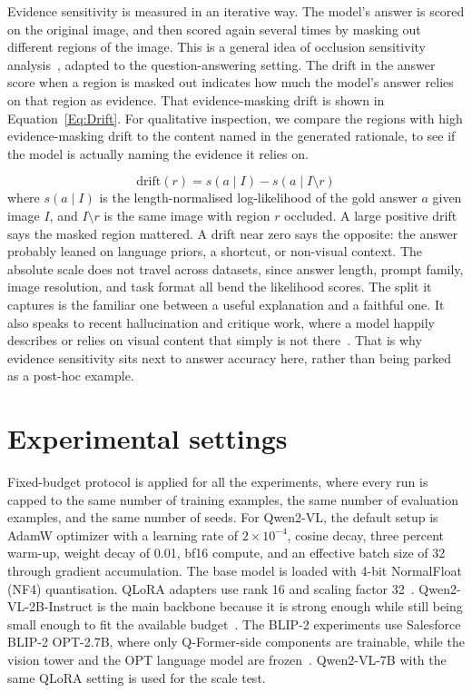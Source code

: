 \documentclass[12pt,bibliography=totoc,listof=totoc,BCOR=5mm,DIV=12,oneside,open=any]{scrbook}
\let\cite\citep
\begin{document}
Evidence sensitivity is measured in an iterative way.
The model's answer is scored on the original image, and then scored again several times by masking out different regions of the image.
This is a general idea of occlusion sensitivity analysis~\cite{zeiler2014visualizing}, adapted to the question-answering setting.
The drift in the answer score when a region is masked out indicates how much the model's answer relies on that region as evidence.
That evidence-masking drift is shown in Equation~\ref{Eq:Drift}.
For qualitative inspection, we compare the regions with high evidence-masking drift to the content named in the generated rationale,
to see if the model is actually naming the evidence it relies on.

\begin{equation}
    \mathrm{drift}(r) = s\!\left(a \mid I\right) - s\!\left(a \mid I \setminus r\right)
    \label{Eq:Drift}
\end{equation}
where $s(a \mid I)$ is the length-normalised log-likelihood of the gold answer $a$ given image $I$, and $I \setminus r$ is the same image with region $r$ occluded.
A large positive drift says the masked region mattered.
A drift near zero says the opposite: the answer probably leaned on language priors, a shortcut, or non-visual context.
The absolute scale does not travel across datasets, since answer length, prompt family, image resolution, and task format all bend the likelihood scores.
The split it captures is the familiar one between a useful explanation and a faithful one.
It also speaks to recent hallucination and critique work, where a model happily describes or relies on visual content that simply is not there~\cite{guan2024hallusionbench,jiang2024hacl,wu2025visco,zhang2025criticv}.
That is why evidence sensitivity sits next to answer accuracy here, rather than being parked as a post-hoc example.

\section{Experimental settings}

Fixed-budget protocol is applied for all the experiments, 
where every run is capped to the same number of training examples,
the same number of evaluation examples, and the same number of seeds.
For Qwen2-VL, the default setup is AdamW optimizer with a learning rate of $2 \times 10^{-4}$,
cosine decay, three percent warm-up, weight decay of 0.01, bf16 compute, and an effective batch size of 32 through gradient accumulation.
The base model is loaded with 4-bit NormalFloat (NF4) quantisation.
QLoRA adapters use rank 16 and scaling factor 32~\cite{hu2022lora,dettmers2023qlora}.
Qwen2-VL-2B-Instruct is the main backbone because it is strong enough while still being small enough to fit the available budget~\cite{wang2024qwen2vl}.
The BLIP-2 experiments use Salesforce BLIP-2 OPT-2.7B, where only Q-Former-side components are trainable, while the vision tower and the OPT language model are frozen~\cite{li2023blip2}.
Qwen2-VL-7B with the same QLoRA setting is used for the scale test.
\end{document}
